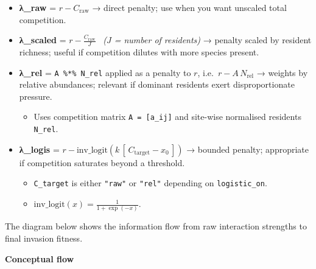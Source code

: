 \documentclass[
]{article}
\providecommand{\tightlist}{%
  \setlength{\itemsep}{0pt}\setlength{\parskip}{0pt}}
\begin{document}
\begin{itemize}
\tightlist
\item
  \textbf{λ\_raw} = \(r - C_{\text{raw}}\) → direct penalty; use when
  you want unscaled total competition.
\item
  \textbf{λ\_scaled} = \(r - \frac{C_{\text{raw}}}{J}\) ~\emph{(\(J\) =
  number of residents)} → penalty scaled by resident richness; useful if
  competition dilutes with more species present.
\item
  \textbf{λ\_rel} = \texttt{A\ \%*\%\ N\_rel} applied as a penalty to
  \(r\), i.e.~\(r - A\,N_{\text{rel}}\) → weights by relative
  abundances; relevant if dominant residents exert disproportionate
  pressure.

  \begin{itemize}
  \tightlist
  \item
    Uses competition matrix \texttt{A\ =\ {[}a\_ij{]}} and site-wise
    normalised residents \texttt{N\_rel}.\\
  \end{itemize}
\item
  \textbf{λ\_logis} =
  \(r - \text{inv\_logit}\!\left(k\,[\,C_{\text{target}} - x_0\,]\right)\)
  → bounded penalty; appropriate if competition saturates beyond a
  threshold.

  \begin{itemize}
  \tightlist
  \item
    \texttt{C\_target} is either \texttt{"raw"} or \texttt{"rel"}
    depending on \texttt{logistic\_on}.\\
  \item
    \(\mathrm{inv\_logit}(x) = \frac{1}{1+\exp(-x)}\).
  \end{itemize}
\end{itemize}

The diagram below shows the information flow from raw interaction
strengths to final invasion fitness.

\textbf{Conceptual flow}
\end{document}
